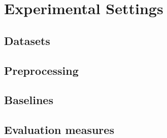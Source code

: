 \section{Experimental Settings}
\label{sec:experimental_settings}
  \subsection{Datasets}
  \label{subsec:datasets}

  \subsection{Preprocessing}
  \label{subsec:preprocessing}

  \subsection{Baselines}
  \label{subsec:baselines}

  \subsection{Evaluation measures}
  \label{subsec:evaluation_measures}

